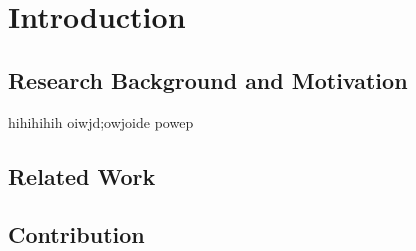 \chapter{Introduction}\label{chap:intro}


\section{Research Background and Motivation}\label{sec:1-motivation}

hihihihih
oiwjd;owjoide
powep \cite{9371931}


\section{Related Work}\label{sec:1-related_work}



\section{Contribution}\label{sec:1-contribution}
